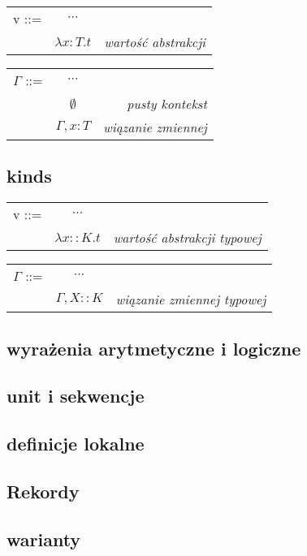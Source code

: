 \documentclass[11pt,leqno]{article}
\begin{document}
\begin{tabular}{ l c r }
  v ::= & $\cdots$ &  \\
   & $\lambda x:T.t$ & \textit{wartość abstrakcji} \\
\end{tabular}



\begin{tabular}{ l c r }
  $\Gamma$ ::= & $\cdots$ &  \\
   & $\emptyset$ & \textit{pusty kontekst} \\
   & $\Gamma,x:T$& \textit{wiązanie zmiennej} \\ 
\end{tabular}



\subsection{kinds}



\begin{tabular}{ l c r }
  v ::= & $\cdots$ &  \\
   & $\lambda x::K.t$ & \textit{wartość abstrakcji typowej} \\
\end{tabular}

\begin{tabular}{ l c r }
  $\Gamma$ ::= & $\cdots$ &  \\
   & $\Gamma,X::K$& \textit{wiązanie zmiennej typowej} \\ 
\end{tabular}

\subsection{wyrażenia arytmetyczne i logiczne}
\subsection{unit i sekwencje}
\subsection {definicje lokalne}
\subsection{Rekordy}
\subsection{warianty}
\end{document}
